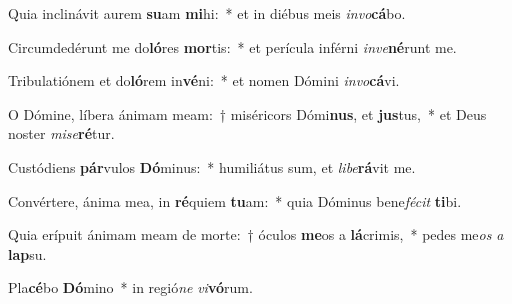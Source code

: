 \item Quia inclinávit aurem \textbf{su}am \textbf{mi}hi:~* et in diébus meis \textit{in}\textit{vo}\textbf{cá}bo.
\item Circumdedérunt me do\textbf{ló}res \textbf{mor}tis:~* et perícula inférni \textit{in}\textit{ve}\textbf{né}runt me.
\item Tribulatiónem et do\textbf{ló}rem in\textbf{vé}ni:~* et nomen Dómini \textit{in}\textit{vo}\textbf{cá}vi.
\item O Dómine, líbera ánimam meam:~† miséricors Dómi\textbf{nus}, et \textbf{jus}tus,~* et Deus noster \textit{mi}\textit{se}\textbf{ré}tur.
\item Custódiens \textbf{pár}vulos \textbf{Dó}minus:~* humiliátus sum, et \textit{li}\textit{be}\textbf{rá}vit me.
\item Convértere, ánima mea, in \textbf{ré}quiem \textbf{tu}am:~* quia Dóminus bene\textit{fé}\textit{cit} \textbf{ti}bi.
\item Quia erípuit ánimam meam de morte:~† óculos \textbf{me}os a \textbf{lá}crimis,~* pedes me\textit{os} \textit{a} \textbf{lap}su.
\item Pla\textbf{cé}bo \textbf{Dó}mino~* in regió\textit{ne} \textit{vi}\textbf{vó}rum.

